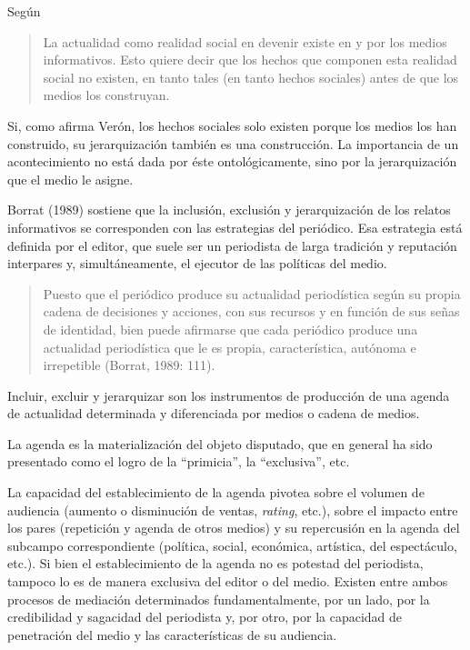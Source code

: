 Según \textcite[IV]{@6978-VERON1987}

\begin{quote}
	La actualidad como realidad social en devenir existe en y por los medios informativos. Esto quiere decir que los hechos que componen esta realidad social no existen, en tanto tales (en tanto hechos sociales) antes de que los medios los construyan.
\end{quote}


Si, como afirma Verón, los hechos sociales solo existen porque los medios los han construido, su jerarquización también es una construcción. La importancia de un acontecimiento no está dada por éste ontológicamente, sino por la jerarquización que el medio le asigne.

Borrat (1989) sostiene que la inclusión, exclusión y jerarquización de los relatos informativos se corresponden con las estrategias del periódico. Esa estrategia está definida por el editor, que suele ser un periodista de larga tradición y reputación interpares y, simultáneamente, el ejecutor de las políticas del medio.

\begin{quote}
	Puesto que el periódico produce su actualidad periodística según su propia cadena de decisiones y acciones, con sus recursos y en función de sus señas de identidad, bien puede afirmarse que cada periódico produce una actualidad periodística que le es propia, característica, autónoma e irrepetible (Borrat, 1989: 111).
\end{quote}


Incluir, excluir y jerarquizar son los instrumentos de producción de una agenda de actualidad determinada y diferenciada por medios o cadena de medios.

La agenda es la materialización del objeto disputado, que en general ha sido presentado como el logro de la \enquote{primicia}, la \enquote{exclusiva}, etc.

La capacidad del establecimiento de la agenda pivotea sobre el volumen de audiencia (aumento o disminución de ventas, \emph{rating}, etc.), sobre el impacto entre los pares (repetición y agenda de otros medios) y su repercusión en la agenda del subcampo correspondiente (política, social, económica, artística, del espectáculo, etc.). Si bien el establecimiento de la agenda no es potestad del periodista, tampoco lo es de manera exclusiva del editor o del medio. Existen entre ambos  procesos de mediación determinados fundamentalmente, por un lado, por la credibilidad y sagacidad del periodista y, por otro, por la capacidad de penetración del medio y las características de su audiencia.

